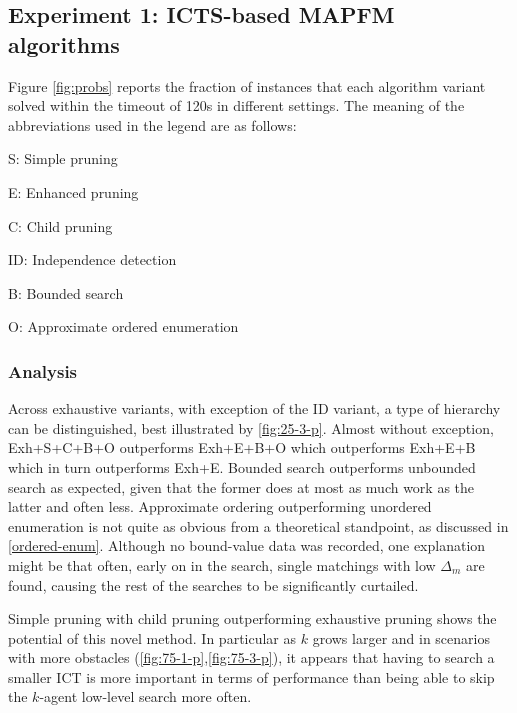 \documentclass[english,10pt]{article}
\begin{document}
	\subsection{Experiment 1: ICTS-based MAPFM algorithms}
	Figure \ref{fig:probs} reports the fraction of instances that each algorithm variant solved within the timeout of 120s in different settings. The meaning of the abbreviations used in the legend are as follows:
	\begin{itemize}
		\begin{minipage}{0.45\linewidth}
			\item S: Simple pruning
			\item E: Enhanced pruning
			\item C: Child pruning
		\end{minipage}
		\begin{minipage}{0.45\linewidth}
			\item ID: Independence detection
			\item B: Bounded search
			\item O: Approximate ordered enumeration
		\end{minipage}
	\end{itemize}
	\subsubsection{Analysis}
	Across exhaustive variants, with exception of the ID variant, a type of hierarchy can be distinguished, best illustrated by \ref{fig:25-3-p}. Almost without exception, Exh+S+C+B+O outperforms Exh+E+B+O which outperforms Exh+E+B which in turn outperforms Exh+E. Bounded search outperforms unbounded search as expected, given that the former does at most as much work as the latter and often less. Approximate ordering outperforming unordered enumeration is not quite as obvious from a theoretical standpoint, as discussed in \ref{ordered-enum}. Although no bound-value data was recorded, one explanation might be that often, early on in the search, single matchings with low $\Delta_m$ are found, causing the rest of the searches to be significantly curtailed.
	
	Simple pruning with child pruning outperforming exhaustive pruning shows the potential of this novel method. In particular as $k$ grows larger and in scenarios with more obstacles (\ref{fig:75-1-p},\ref{fig:75-3-p}), it appears that having to search a smaller ICT is more important in terms of performance than being able to skip the $k$-agent low-level search more often. 
	
\end{document}
